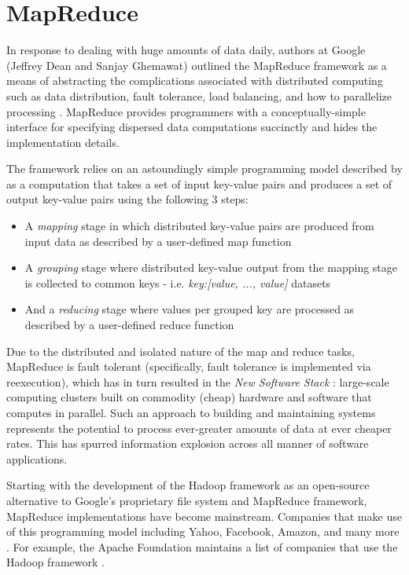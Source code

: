 \section{MapReduce}
In response to dealing with huge amounts of data daily, authors at Google (Jeffrey Dean and Sanjay Ghemawat) outlined the MapReduce framework as a means of abstracting the complications associated with distributed computing such as data distribution, fault tolerance, load balancing, and how to parallelize processing \cite{Dean:2008}. MapReduce provides programmers with a conceptually-simple interface for specifying dispersed data computations succinctly and hides the implementation details.

The framework relies on an astoundingly simple programming model described by \cite{Dean:2008} as a computation that takes a set of input key-value pairs and produces a set of output key-value pairs using the following 3 steps:

\begin{itemize}
    \item A \textit{mapping} stage in which distributed key-value pairs are produced from input data as described by a user-defined map function
    \item A \textit{grouping} stage where distributed key-value output from the mapping stage is collected to common keys - i.e. \textit{key:[value, ..., value]} datasets
    \item And a \textit{reducing} stage where values per grouped key are processed as described by a user-defined reduce function
\end{itemize}

Due to the distributed and isolated nature of the map and reduce tasks, MapReduce is fault tolerant (specifically, fault tolerance is implemented via reexecution), which has in turn resulted in the \textit{New Software Stack} \cite{mining2011}: large-scale computing clusters built on commodity (cheap) hardware and software that computes in parallel. Such an approach to building and maintaining systems represents the potential to process ever-greater amounts of data at ever cheaper rates. This has spurred information explosion across all manner of software applications.

Starting with the development of the Hadoop framework as an open-source alternative to Google's proprietary file system and MapReduce framework, MapReduce implementations have become mainstream. Companies that make use of this programming model including Yahoo, Facebook, Amazon, and many more \cite{chandar2010}. For example, the Apache Foundation maintains a list of companies that use the Hadoop framework \cite{hadoopPower:2017}.

